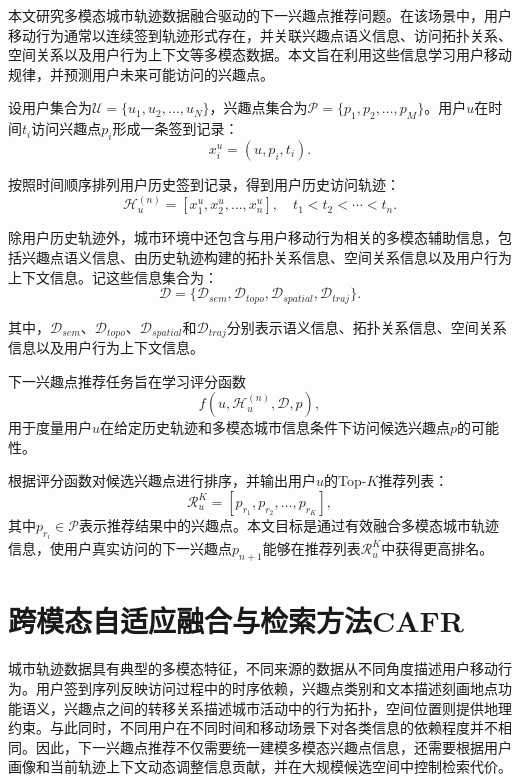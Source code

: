 \documentclass{rjthesis}
\begin{document}
本文研究多模态城市轨迹数据融合驱动的下一兴趣点推荐问题。在该场景中，用户移动行为通常以连续签到轨迹形式存在，并关联兴趣点语义信息、访问拓扑关系、空间关系以及用户行为上下文等多模态数据。本文旨在利用这些信息学习用户移动规律，并预测用户未来可能访问的兴趣点。

设用户集合为$\mathcal{U}=\{u_1,u_2,\ldots,u_N\}$，兴趣点集合为$\mathcal{P}=\{p_1,p_2,\ldots,p_M\}$。用户$u$在时间$t_i$访问兴趣点$p_i$形成一条签到记录：
\begin{equation}
x_i^u=(u,p_i,t_i).
\end{equation}

按照时间顺序排列用户历史签到记录，得到用户历史访问轨迹：
\begin{equation}
\mathcal{H}_u^{(n)}
=
[x_1^u,x_2^u,\ldots,x_n^u],
\quad t_1<t_2<\cdots<t_n .
\end{equation}

除用户历史轨迹外，城市环境中还包含与用户移动行为相关的多模态辅助信息，包括兴趣点语义信息、由历史轨迹构建的拓扑关系信息、空间关系信息以及用户行为上下文信息。记这些信息集合为：
\begin{equation}
\mathcal{D}
=
\{
\mathcal{D}_{sem},
\mathcal{D}_{topo},
\mathcal{D}_{spatial},
\mathcal{D}_{traj}
\}.
\end{equation}

其中，\(\mathcal{D}_{sem}\)、\(\mathcal{D}_{topo}\)、\(\mathcal{D}_{spatial}\)和\(\mathcal{D}_{traj}\)分别表示语义信息、拓扑关系信息、空间关系信息以及用户行为上下文信息。

下一兴趣点推荐任务旨在学习评分函数
\begin{equation}
f(u,\mathcal{H}_u^{(n)},\mathcal{D},p),
\end{equation}
用于度量用户$u$在给定历史轨迹和多模态城市信息条件下访问候选兴趣点$p$的可能性。

根据评分函数对候选兴趣点进行排序，并输出用户$u$的Top-$K$推荐列表：
\begin{equation}
\mathcal{R}_u^K
=
[p_{r_1},p_{r_2},\ldots,p_{r_K}],
\end{equation}
其中$p_{r_i}\in\mathcal{P}$表示推荐结果中的兴趣点。本文目标是通过有效融合多模态城市轨迹信息，使用户真实访问的下一兴趣点$p_{n+1}$能够在推荐列表$\mathcal{R}_u^K$中获得更高排名。

\section{跨模态自适应融合与检索方法CAFR}

城市轨迹数据具有典型的多模态特征，不同来源的数据从不同角度描述用户移动行为。用户签到序列反映访问过程中的时序依赖，兴趣点类别和文本描述刻画地点功能语义，兴趣点之间的转移关系描述城市活动中的行为拓扑，空间位置则提供地理约束。与此同时，不同用户在不同时间和移动场景下对各类信息的依赖程度并不相同。因此，下一兴趣点推荐不仅需要统一建模多模态兴趣点信息，还需要根据用户画像和当前轨迹上下文动态调整信息贡献，并在大规模候选空间中控制检索代价。
\end{document}
